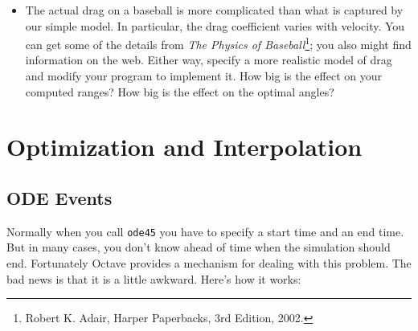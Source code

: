\documentclass{book}
\begin{document}
\begin{ex}
\begin{itemize}
\item The actual drag on a baseball is more complicated than what is
captured by our simple model. In particular, the drag coefficient
varies with velocity. You can get some of the details from {\em The
Physics of Baseball}\footnote{Robert K. Adair, Harper Paperbacks, 3rd
Edition, 2002.}; you also might find information on the web.
Either way, specify a more realistic model of drag and modify your
program to implement it. How big is the effect on your computed
ranges? How big is the effect on the optimal angles?

\end{itemize}

\end{ex}


\chapter{Optimization and Interpolation}

\section{ODE Events}
\label{events}

Normally when you call {\tt ode45} you have to specify
a start time and an end time. But in many cases, you don't know ahead
of time when the simulation should end.
Fortunately Octave provides a mechanism for dealing
with this problem. The bad news is that it is a little awkward.
Here's how it works:
\end{document}
